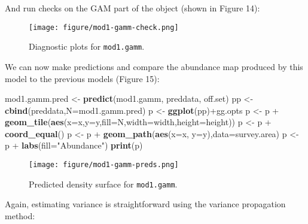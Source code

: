 \documentclass[]{article}
\newenvironment{Shaded}{}{}
\newcommand{\KeywordTok}[1]{\textcolor[rgb]{0.00,0.44,0.13}{\textbf{{#1}}}}
\newcommand{\DataTypeTok}[1]{\textcolor[rgb]{0.56,0.13,0.00}{{#1}}}
\newcommand{\StringTok}[1]{\textcolor[rgb]{0.25,0.44,0.63}{{#1}}}
\newcommand{\NormalTok}[1]{{#1}}
\begin{document}
And run checks on the GAM part of the object (shown in Figure 14):

\begin{Shaded}
\end{Shaded}

\begin{figure}[htbp]
\centering
\texttt{[image: figure/mod1-gamm-check.png]}
\caption{Diagnostic plots for \texttt{mod1.gamm}.}
\end{figure}

We can now make predictions and compare the abundance map produced by
this model to the previous models (Figure 15):

\begin{Shaded}
\begin{Highlighting}[]
\NormalTok{mod1.gamm.pred <-}\StringTok{ }\KeywordTok{predict}\NormalTok{(mod1.gamm, preddata, off.set)}
\NormalTok{pp <-}\StringTok{ }\KeywordTok{cbind}\NormalTok{(preddata,}\DataTypeTok{N=}\NormalTok{mod1.gamm.pred)}
\NormalTok{p <-}\StringTok{ }\KeywordTok{ggplot}\NormalTok{(pp)+gg.opts}
\NormalTok{p <-}\StringTok{ }\NormalTok{p +}\StringTok{ }\KeywordTok{geom_tile}\NormalTok{(}\KeywordTok{aes}\NormalTok{(}\DataTypeTok{x=}\NormalTok{x,}\DataTypeTok{y=}\NormalTok{y,}\DataTypeTok{fill=}\NormalTok{N,}\DataTypeTok{width=}\NormalTok{width,}\DataTypeTok{height=}\NormalTok{height))}
\NormalTok{p <-}\StringTok{ }\NormalTok{p +}\StringTok{ }\KeywordTok{coord_equal}\NormalTok{()}
\NormalTok{p <-}\StringTok{ }\NormalTok{p +}\StringTok{ }\KeywordTok{geom_path}\NormalTok{(}\KeywordTok{aes}\NormalTok{(}\DataTypeTok{x=}\NormalTok{x, }\DataTypeTok{y=}\NormalTok{y),}\DataTypeTok{data=}\NormalTok{survey.area)}
\NormalTok{p <-}\StringTok{ }\NormalTok{p +}\StringTok{ }\KeywordTok{labs}\NormalTok{(}\DataTypeTok{fill=}\StringTok{"Abundance"}\NormalTok{)}
\KeywordTok{print}\NormalTok{(p)}
\end{Highlighting}
\end{Shaded}

\begin{figure}[htbp]
\centering
\texttt{[image: figure/mod1-gamm-preds.png]}
\caption{Predicted density surface for \texttt{mod1.gamm}.}
\end{figure}

Again, estimating variance is straightforward using the variance
propagation method:
\end{document}
